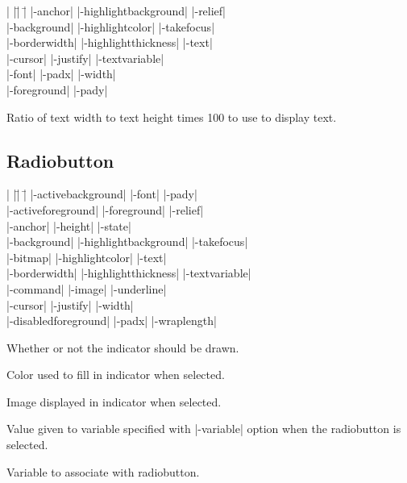 \begin{tabbing}
|                   |\=|                     |\= \kill
|-anchor|           \> |-highlightbackground| \> |-relief| \\
|-background|       \> |-highlightcolor|     \> |-takefocus| \\
|-borderwidth|      \> |-highlightthickness| \> |-text| \\
|-cursor|	    \> |-justify|            \> |-textvariable| \\
|-font|             \> |-padx|               \> |-width| \\
|-foreground|       \> |-pady| \\
\end{tabbing}

\vskip5pt
\begin{enum}{1cm}

Ratio of text width to text height times 100 to use to display text.

\end{enum}

\subsection*{Radiobutton}
\vspace{-4pt}

\begin{tabbing}
|                   |\=|                     |\= \kill
|-activebackground| \> |-font|               \> |-pady| \\
|-activeforeground| \> |-foreground|         \> |-relief| \\
|-anchor|           \> |-height|             \> |-state| \\
|-background|       \> |-highlightbackground| \> |-takefocus| \\    
|-bitmap|           \> |-highlightcolor|     \> |-text| \\        
|-borderwidth|      \> |-highlightthickness| \> |-textvariable| \\
|-command|          \> |-image|              \> |-underline| \\   
|-cursor|	    \> |-justify| 	     \> |-width| \\       
|-disabledforeground| \> |-padx| 	     \> |-wraplength| \\  
\end{tabbing}

\vskip5pt
\begin{enum}{1cm}

 Whether  or  not the indicator should be drawn.

 Color used to fill in indicator when selected.

 Image displayed in indicator when selected.

 Value given to variable specified with |-variable|
option when the radiobutton is selected.

 Variable to associate with radiobutton.

\end{enum}

